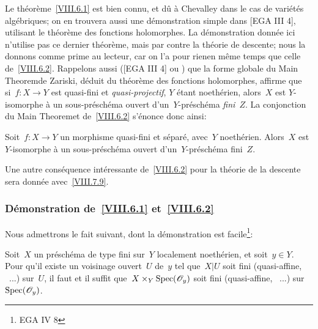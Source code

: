 \begin{remarques}
\label{VIII.6.3}
Le
th\'eor\`eme~\ref{VIII.6.1} est bien connu, et d\^u \`a
Chevalley dans le cas de vari\'et\'es alg\'ebriques; on en
trouvera aussi une d\'emonstration simple dans [EGA III 4],
utilisant le \og th\'eor\`eme des fonctions holomorphes\fg. La
d\'emonstration donn\'ee ici n'utilise pas ce dernier
th\'eor\`eme, mais par contre la th\'eorie de descente; nous
la donnons comme prime au lecteur, car on l'a \og pour rien\fg en
m\^eme temps que celle de~\ref{VIII.6.2}. Rappelons aussi ([EGA III
4] ou \cite{VIII.1}) que la forme globale du \og Main Theorem\fg de Zariski,
d\'eduit du \og th\'eor\`eme des fonctions holomorphes\fg, affirme
que si~$f\colon X\to Y$ est quasi-fini et \emph{quasi-projectif}, $Y$
\'etant noeth\'erien, alors~$X$ est $Y$-isomorphe \`a un
sous-pr\'esch\'ema ouvert d'un~$Y$-pr\'esch\'ema
\emph{fini}~$Z$. La conjonction du \og Main Theorem\fg et
de~\ref{VIII.6.2} s'\'enonce donc ainsi:
\end{remarques}

\begin{corollaire}
\label{VIII.6.4}
Soit~$f\colon X\to Y$ un morphisme quasi-fini et s\'epar\'e,
avec~$Y$ noeth\'erien. Alors~$X$ est $Y$-isomorphe \`a un
sous-pr\'esch\'ema ouvert d'un~$Y$-pr\'esch\'ema fini~$Z$.
\end{corollaire}

Une autre cons\'equence int\'eressante de~\ref{VIII.6.2} pour la
th\'eorie de la descente sera donn\'ee avec~\ref{VIII.7.9}.

\subsubsection*{D\'emonstration de~\ref{VIII.6.1} et~\ref{VIII.6.2}}
Nous admettrons le fait suivant, dont la d\'emonstration est
facile\footnote{\Cf EGA IV 8}:

\begin{lemme}
\label{VIII.6.5}
Soit~$X$ un pr\'esch\'ema de type fini sur~$Y$ localement
noeth\'erien, et soit~$y\in Y$. Pour qu'il existe un voisinage
ouvert~$U$ de~$y$ tel que~$X|U$ soit fini (\resp quasi-affine,
\resp\ ...) sur~$U$, il faut et il suffit
que~$X\times_{Y}\operatorname{Spec}(\mathscr{O}_{y})$ soit fini (\resp quasi-affine,
\resp\ ...) sur~$\operatorname{Spec}(\mathscr{O}_{y})$.
\end{lemme}

